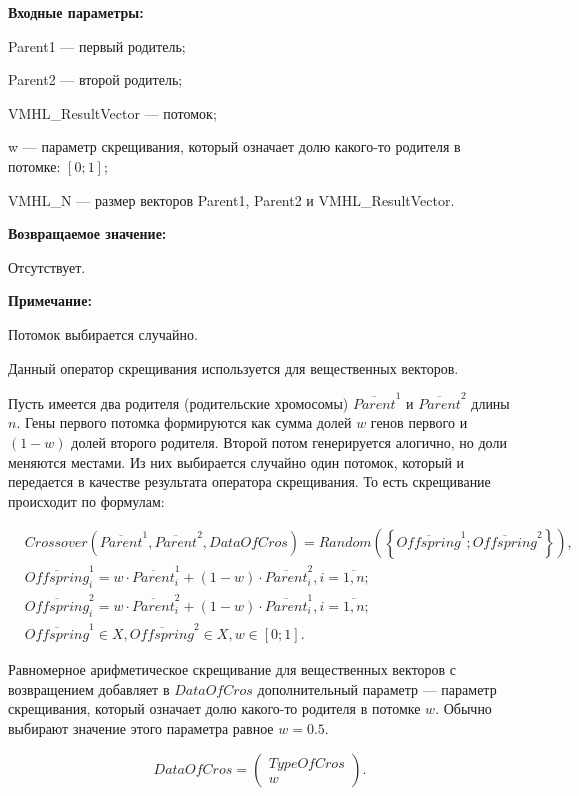 \textbf{Входные параметры:}
 
Parent1 --- первый родитель;
 
Parent2 --- второй родитель;
 
VMHL\_ResultVector --- потомок;

w --- параметр скрещивания, который означает долю какого-то родителя в потомке: $[0;1]$;
 
VMHL\_N --- размер векторов Parent1, Parent2 и VMHL\_ResultVector.

\textbf{Возвращаемое значение:}

 Отсутствует.
 
\textbf{ Примечание:}

 Потомок выбирается случайно.
 
Данный оператор скрещивания используется для вещественных векторов.

Пусть имеется два родителя (родительские хромосомы) $ \overline{Parent}^1 $ и $ \overline{Parent}^2$ длины $n$. Гены первого потомка формируются как сумма долей $w$ генов первого и $ \left( 1-w\right) $ долей второго родителя. Второй потом генерируется алогично, но доли меняются местами.  Из них выбирается случайно один потомок, который и передается в качестве результата оператора скрещивания. То есть скрещивание происходит по формулам:

\begin{align}
\label{SetOfOperatorsAlgorithms:eq:ArithmeticalCrossoverForReal}
&Crossover \left( \overline{Parent}^1, \overline{Parent}^2, DataOfCros\right)=Random \left(\left\lbrace \overline{Offspring}^1; \overline{Offspring}^2\right\rbrace  \right), \\
& \overline{Offspring}^1_i=w\cdot\overline{Parent}^1_i+\left( 1-w\right)\cdot\overline{Parent}^2_i , i=\overline{1,n};\nonumber\\
&\overline{Offspring}^2_i=w\cdot\overline{Parent}^2_i+\left( 1-w\right)\cdot\overline{Parent}^1_i , i=\overline{1,n};\nonumber\\
&\overline{Offspring}^1\in X, \overline{Offspring}^2\in X, w\in \left[ 0; 1\right] .\nonumber
\end{align}

Равномерное арифметическое скрещивание для вещественных векторов с возвращением добавляет в $ DataOfCros $ дополнительный параметр --- параметр скрещивания, который означает долю какого-то родителя в потомке $ w $. Обычно выбирают значение этого параметра равное $ w=0.5 $.

\begin{equation}
DataOfCros=\left( \begin{array}{c} TypeOfCros \\ w \end{array} \right).
\end{equation}